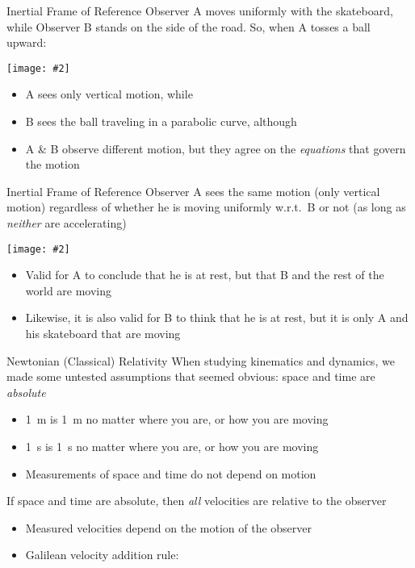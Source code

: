 \documentclass[12pt,compress,aspectratio=169]{beamer}
\newcommand{\mb}[1]{\mathbf{#1}}
\newcommand{\pic}[2]{\texttt{[image: \#2]}}
\newcommand{\eq}[2]{\vspace{#1}{\Large\begin{displaymath}#2\end{displaymath}}}
\begin{document}
\begin{frame}{Inertial Frame of Reference}
  Observer A moves uniformly with the skateboard, while Observer B stands on
  the side of the road. So, when A tosses a ball upward:
  \begin{center}
    \pic{.55}{graphics/57.png}
  \end{center}
  \begin{itemize}
  \item A sees only vertical motion, while
  \item B sees the ball traveling in a parabolic curve, although
  \item A \& B observe different motion, but they agree on the \emph{equations}
    that govern the motion
  \end{itemize}
\end{frame}



\begin{frame}{Inertial Frame of Reference}
  Observer A sees the same motion (only vertical motion) regardless of whether
  he is moving uniformly w.r.t.\ B or not (as long as \emph{neither} are
  accelerating)
  \begin{center}
    \pic{.55}{graphics/57.png}
  \end{center}
  \begin{itemize}
  \item Valid for A to conclude that he is at rest, but that B and the rest of
    the world are moving
  \item Likewise, it is also valid for B to think that he is at rest, but it is
    only A and his skateboard that are moving
  \end{itemize}
\end{frame}
    

\begin{frame}{Newtonian (Classical) Relativity}
  When studying kinematics and dynamics, we made some untested assumptions that
  seemed obvious: space and time are \emph{absolute}
  \begin{itemize}
  \item \SI{1}{m} is \SI{1}{m} no matter where you are, or how you are moving
  \item \SI{1}{s} is \SI{1}{s} no matter where you are, or how you are moving
  \item Measurements of space and time do not depend on motion
  \end{itemize}
  \vspace{.1in}If space and time are absolute, then \emph{all} velocities are
  relative to the observer
  \begin{itemize}
  \item Measured velocities depend on the motion of the observer
  \item Galilean velocity addition rule:

    \eq{-.25in}{
      \boxed{\mb{v}_{AC}=\mb{v}_{AB}+\mb{v}_{BC}}
    }
  \end{itemize}
\end{frame}
\end{document}
